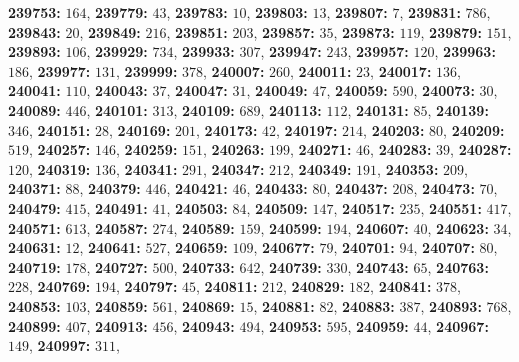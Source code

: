 \textsf{\bfseries 239753:} $164$, \textsf{\bfseries 239779:} $43$, \textsf{\bfseries 239783:} $10$, \textsf{\bfseries 239803:} $13$, \textsf{\bfseries 239807:} $7$, \textsf{\bfseries 239831:} $786$, \textsf{\bfseries 239843:} $20$, \textsf{\bfseries 239849:} $216$, \textsf{\bfseries 239851:} $203$, \textsf{\bfseries 239857:} $35$, \textsf{\bfseries 239873:} $119$, \textsf{\bfseries 239879:} $151$, \textsf{\bfseries 239893:} $106$, \textsf{\bfseries 239929:} $734$, \textsf{\bfseries 239933:} $307$, \textsf{\bfseries 239947:} $243$, \textsf{\bfseries 239957:} $120$, \textsf{\bfseries 239963:} $186$, \textsf{\bfseries 239977:} $131$, \textsf{\bfseries 239999:} $378$, \textsf{\bfseries 240007:} $260$, \textsf{\bfseries 240011:} $23$, \textsf{\bfseries 240017:} $136$, \textsf{\bfseries 240041:} $110$, \textsf{\bfseries 240043:} $37$, \textsf{\bfseries 240047:} $31$, \textsf{\bfseries 240049:} $47$, \textsf{\bfseries 240059:} $590$, \textsf{\bfseries 240073:} $30$, \textsf{\bfseries 240089:} $446$, \textsf{\bfseries 240101:} $313$, \textsf{\bfseries 240109:} $689$, \textsf{\bfseries 240113:} $112$, \textsf{\bfseries 240131:} $85$, \textsf{\bfseries 240139:} $346$, \textsf{\bfseries 240151:} $28$, \textsf{\bfseries 240169:} $201$, \textsf{\bfseries 240173:} $42$, \textsf{\bfseries 240197:} $214$, \textsf{\bfseries 240203:} $80$, \textsf{\bfseries 240209:} $519$, \textsf{\bfseries 240257:} $146$, \textsf{\bfseries 240259:} $151$, \textsf{\bfseries 240263:} $199$, \textsf{\bfseries 240271:} $46$, \textsf{\bfseries 240283:} $39$, \textsf{\bfseries 240287:} $120$, \textsf{\bfseries 240319:} $136$, \textsf{\bfseries 240341:} $291$, \textsf{\bfseries 240347:} $212$, \textsf{\bfseries 240349:} $191$, \textsf{\bfseries 240353:} $209$, \textsf{\bfseries 240371:} $88$, \textsf{\bfseries 240379:} $446$, \textsf{\bfseries 240421:} $46$, \textsf{\bfseries 240433:} $80$, \textsf{\bfseries 240437:} $208$, \textsf{\bfseries 240473:} $70$, \textsf{\bfseries 240479:} $415$, \textsf{\bfseries 240491:} $41$, \textsf{\bfseries 240503:} $84$, \textsf{\bfseries 240509:} $147$, \textsf{\bfseries 240517:} $235$, \textsf{\bfseries 240551:} $417$, \textsf{\bfseries 240571:} $613$, \textsf{\bfseries 240587:} $274$, \textsf{\bfseries 240589:} $159$, \textsf{\bfseries 240599:} $194$, \textsf{\bfseries 240607:} $40$, \textsf{\bfseries 240623:} $34$, \textsf{\bfseries 240631:} $12$, \textsf{\bfseries 240641:} $527$, \textsf{\bfseries 240659:} $109$, \textsf{\bfseries 240677:} $79$, \textsf{\bfseries 240701:} $94$, \textsf{\bfseries 240707:} $80$, \textsf{\bfseries 240719:} $178$, \textsf{\bfseries 240727:} $500$, \textsf{\bfseries 240733:} $642$, \textsf{\bfseries 240739:} $330$, \textsf{\bfseries 240743:} $65$, \textsf{\bfseries 240763:} $228$, \textsf{\bfseries 240769:} $194$, \textsf{\bfseries 240797:} $45$, \textsf{\bfseries 240811:} $212$, \textsf{\bfseries 240829:} $182$, \textsf{\bfseries 240841:} $378$, \textsf{\bfseries 240853:} $103$, \textsf{\bfseries 240859:} $561$, \textsf{\bfseries 240869:} $15$, \textsf{\bfseries 240881:} $82$, \textsf{\bfseries 240883:} $387$, \textsf{\bfseries 240893:} $768$, \textsf{\bfseries 240899:} $407$, \textsf{\bfseries 240913:} $456$, \textsf{\bfseries 240943:} $494$, \textsf{\bfseries 240953:} $595$, \textsf{\bfseries 240959:} $44$, \textsf{\bfseries 240967:} $149$, \textsf{\bfseries 240997:} $311$, 

